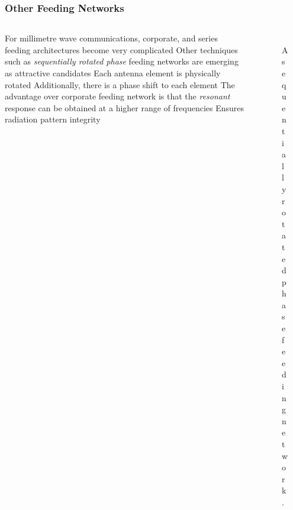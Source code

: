 \documentclass[10pt]{beamer}
\begin{document}
\begin{frame}
    \frametitle{Other Feeding Networks}
    \begin{columns}[] %
        \begin{column}{.7\textwidth}
            \begin{outline}
                \small
                \1 For millimetre wave communications, corporate, and series feeding architectures become very complicated
                \1 Other techniques such as \textit{sequentially rotated phase} feeding networks are emerging as attractive candidates
                \2 Each antenna element is physically rotated
                \2 Additionally, there is a phase shift to each element
                \1 The advantage over corporate feeding network is that the \textit{resonant} response can be obtained at a higher range of frequencies
                \2 Ensures radiation pattern integrity
            \end{outline}   
        \end{column}
        \begin{column}{.4\textwidth}
            \begin{figure}[h!]
                \centering
                \includegraphics[width=.95\textwidth]{SRP.pdf}
                \caption{\small A sequentially rotated phase feeding network \footnotemark[1].}
            \end{figure}
        \end{column}%
    \end{columns}
\end{frame}
\end{document}
